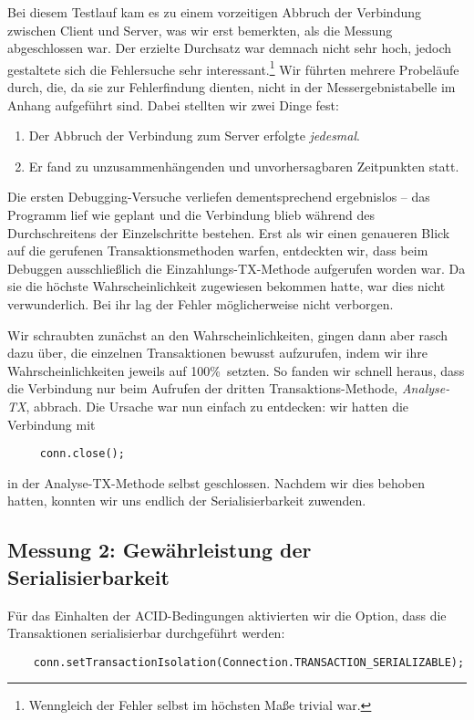 \documentclass[a4paper, bibliography=totoc, 12pt]{scrartcl}
\begin{document}
	\noindent
	Bei diesem Testlauf kam es zu einem vorzeitigen Abbruch der Verbindung zwischen Client und Server, was wir erst bemerkten, als die Messung abgeschlossen war. Der erzielte Durchsatz war demnach nicht sehr hoch, jedoch gestaltete sich die Fehlersuche sehr interessant.\footnote{Wenngleich der Fehler selbst im höchsten Maße trivial war.} Wir führten mehrere Probeläufe durch, die, da sie zur Fehlerfindung dienten, nicht in der Messergebnistabelle im Anhang aufgeführt sind. Dabei stellten wir zwei Dinge fest:
\begin{enumerate}
\itemsep0pt
\item Der Abbruch der Verbindung zum Server erfolgte \emph{jedesmal}.
\item Er fand zu unzusammenhängenden und unvorhersagbaren Zeitpunkten statt.
\end{enumerate}	
	 Die ersten Debugging-Versuche verliefen dementsprechend ergebnislos -- das Programm lief wie geplant und die Verbindung blieb während des Durchschreitens der Einzelschritte bestehen. Erst als wir einen genaueren Blick auf die gerufenen Transaktionsmethoden warfen, entdeckten wir, dass beim Debuggen ausschließlich die Einzahlungs-TX-Methode aufgerufen worden war. Da sie die höchste Wahrscheinlichkeit zugewiesen bekommen hatte, war dies nicht verwunderlich. Bei ihr lag der Fehler möglicherweise nicht verborgen.
	 
	 Wir schraubten zunächst an den Wahrscheinlichkeiten, gingen dann aber rasch dazu über, die einzelnen Transaktionen bewusst aufzurufen, indem wir ihre Wahrscheinlichkeiten jeweils auf 100\%\ setzten. So fanden wir schnell heraus, dass die Verbindung nur beim Aufrufen der dritten Transaktions-Methode, \emph{Analyse-TX}, abbrach. Die Ursache war nun einfach zu entdecken: wir hatten die Verbindung mit 
	 \begin{lstlisting}
	 conn.close();
	 \end{lstlisting}

\noindent
in der Analyse-TX-Methode selbst geschlossen.	
	Nachdem wir dies behoben hatten, konnten wir uns endlich der Serialisierbarkeit zuwenden.
	\subsection{Messung 2: Gewährleistung der Serialisierbarkeit}
Für das Einhalten der ACID-Bedingungen aktivierten wir die Option, dass die Transaktionen serialisierbar durchgeführt werden:
	\begin{lstlisting}
	conn.setTransactionIsolation(Connection.TRANSACTION_SERIALIZABLE);	
	\end{lstlisting}	
	
\end{document}
